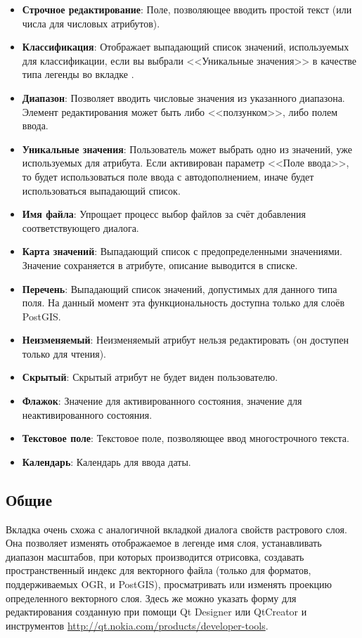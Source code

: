 \begin{itemize}[label=--]
\item \textbf{Строчное редактирование}: Поле, позволяющее вводить простой текст
(или числа для числовых атрибутов).
\item \textbf{Классификация}: Отображает выпадающий список значений, используемых для
классификации, если вы выбрали <<Уникальные значения>> в качестве типа легенды
во вкладке .
\item \textbf{Диапазон}: Позволяет вводить числовые значения из указанного
диапазона. Элемент редактирования может быть либо <<ползунком>>, либо
полем ввода.
\item \textbf{Уникальные значения}: Пользователь может выбрать одно из значений, уже
используемых для атрибута. Если активирован параметр <<Поле ввода>>, то
будет использоваться поле ввода с автодополнением, иначе будет использоваться
выпадающий список.
\item \textbf{Имя файла}: Упрощает процесс выбор файлов за счёт добавления
соответствующего диалога.
\item \textbf{Карта значений}: Выпадающий список с предопределенными значениями.
Значение сохраняется в атрибуте, описание выводится в списке.
\item \textbf{Перечень}: Выпадающий список значений, допустимых для данного типа
поля. На данный момент эта функциональность доступна только для слоёв PostGIS.
\item \textbf{Неизменяемый}: Неизменяемый атрибут нельзя редактировать (он
доступен только для чтения).
\item \textbf{Скрытый}: Скрытый атрибут не будет виден пользователю.
\item \textbf{Флажок}: Значение для активированного состояния, значение для
неактивированного состояния.
\item \textbf{Текстовое поле}: Текстовое поле, позволяющее ввод многострочного текста.
\item \textbf{Календарь}: Календарь для ввода даты.
\end{itemize}

\subsection{Общие}\label{vectorgeneraltab}

Вкладка  очень схожа с аналогичной вкладкой диалога свойств
растрового слоя. Она позволяет изменять отображаемое в легенде имя слоя,
устанавливать диапазон масштабов, при которых производится отрисовка,
создавать пространственный индекс для векторного файла (только для форматов,
поддерживаемых OGR, и PostGIS), просматривать или изменять проекцию
определенного векторного слоя. Здесь же можно указать форму для редактирования
созданную при помощи Qt Designer или QtCreator и инструментов
\url{http://qt.nokia.com/products/developer-tools}.

